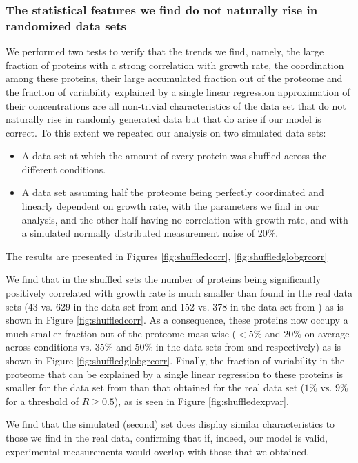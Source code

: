 \subsubsection{The statistical features we find do not naturally rise in randomized data sets}
We performed two tests to verify that the trends we find, namely, the large fraction of proteins with a strong correlation with growth rate, the coordination among these proteins, their large accumulated fraction out of the proteome and the fraction of variability explained by a single linear regression approximation of their concentrations are all non-trivial characteristics of the data set that do not naturally rise in randomly generated data but that do arise if our model is correct.
To this extent we repeated our analysis on two simulated data sets:
\begin{itemize}
\item A data set at which the amount of every protein was shuffled across the different conditions.
\item A data set assuming half the proteome being perfectly coordinated and linearly dependent on growth rate, with the parameters we find in our analysis, and the other half having no correlation with growth rate, and with a simulated normally distributed measurement noise of $20\%$.
\end{itemize}
The results are presented in Figures \ref{fig:shuffledcorr}, \ref{fig:shuffledglobgrcorr}

We find that in the shuffled sets the number of proteins being significantly positively correlated with
growth rate is much smaller than found in the real data sets (43 vs. 629 in the data set from \cite{Heinemann2015} and 152 vs. 378 in the data set from \cite{Valgepea2013}) as is shown in Figure \ref{fig:shuffledcorr}.
As a consequence, these proteins now occupy a much smaller fraction out of the proteome mass-wise ($<5\%$ and $20\%$ on average across conditions vs. $35\%$ and $50\%$ in the data sets from \cite{Heinemann2015} and \cite{Valgepea2013} respectively) as is shown in Figure \ref{fig:shuffledglobgrcorr}.
Finally, the fraction of variability in the proteome that can be explained by a single linear regression to these proteins is smaller for the data set from \cite{Heinemann2015} than that obtained for the real data set ($1\%$ vs. $9\%$ for a threshold of $R\ge0.5$), as is seen in Figure \ref{fig:shuffledexpvar}.

We find that the simulated (second) set does display similar characteristics to those we find in the real data, confirming that if, indeed, our model is valid, experimental measurements would overlap with those that we obtained.